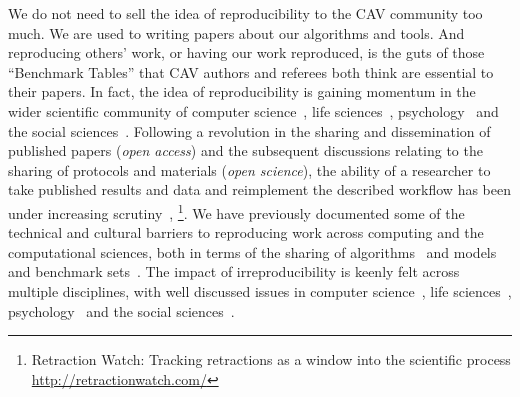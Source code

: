 \documentclass{llncs}
\begin{document}
We do not need to sell the idea of reproducibility to the CAV
community too much. We are used to writing papers about our algorithms
and tools.  And reproducing others' work, or having our work
reproduced, is the guts of those ``Benchmark Tables'' that CAV authors
and referees both think are essential to their papers. In fact, the
idea of reproducibility is gaining momentum in the wider scientific
community of computer science~\cite{collberg-et-al:2014}, life
sciences~\cite{rollins-et-al:2014},
psychology~\cite{chambers-et-al:2014} and the social
sciences~\cite{conte-et-al:2012}.
Following a revolution in the sharing and dissemination of published
papers (\emph{open access}) and the subsequent discussions relating to
the sharing of protocols and materials (\emph{open science}), the
ability of a researcher to take published results and data and
reimplement the described workflow has been under increasing
scrutiny~\cite{stodden-et-al:2013,sandve-et-al:2013,wilson-et-al:2014},
\footnote{Retraction Watch: Tracking retractions as a window
into the scientific
process\\\url{http://retractionwatch.com/}}. 
We have previously documented some of
the technical and cultural barriers to reproducing work across
computing and the computational sciences, both in terms of the sharing
of algorithms~\cite{crick-et-al_recomp2014} and models and benchmark
sets~\cite{crick-et-al_wssspe2}. The impact of irreproducibility is
keenly felt across multiple disciplines, with well discussed issues in
computer science~\cite{collberg-et-al:2014}, life
sciences~\cite{rollins-et-al:2014},
psychology~\cite{chambers-et-al:2014} and the social
sciences~\cite{conte-et-al:2012}.
\end{document}
